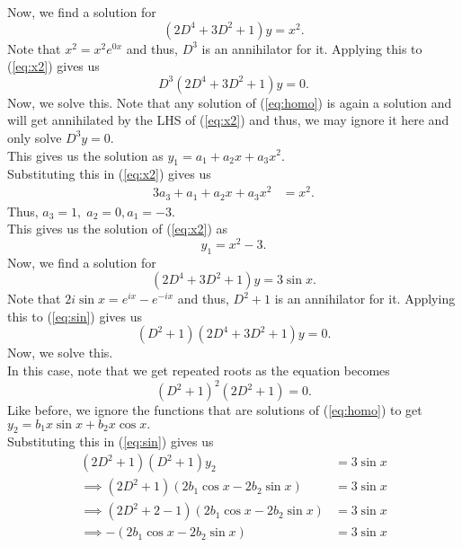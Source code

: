 \documentclass{article}
\begin{document}
\begin{enumerate}[label = Q.\arabic*.]
\begin{enumerate}[start = 8, label = (\roman*)]
		Now, we find a solution for
		\begin{equation} \label{eq:x2}
			(2D^4 + 3D^2 + 1)y = x^2.
		\end{equation}
		Note that $x^2 = x^2e^{0x}$ and thus, $D^3$ is an annihilator for it. Applying this to (\ref{eq:x2}) gives us
		\begin{equation*} 
			D^3(2D^4 + 3D^2 + 1)y = 0.
		\end{equation*}
		Now, we solve this. Note that any solution of (\ref{eq:homo}) is again a solution and will get annihilated by the LHS of (\ref{eq:x2}) and thus, we may ignore it here and only solve $D^3y = 0.$\\
		This gives us the solution as $y_1 = a_1 + a_2x + a_3x^2.$\\
		Substituting this in (\ref{eq:x2}) gives us
		\begin{align*} 
			3a_3 + a_1 + a_2x + a_3x^2 &= x^2.
		\end{align*}
		Thus, $a_3 = 1,\;a_2 = 0, a_1 = -3.$\\
		This gives us the solution of (\ref{eq:x2})	as 
		\begin{equation} \label{eq:solnx2}
			y_1 = x^2 - 3.
		\end{equation}
		Now, we find a solution for
		\begin{equation} \label{eq:sin}
			(2D^4 + 3D^2 + 1)y = 3\sin x.
		\end{equation}
		Note that $2i\sin x = e^{ix} - e^{-ix}$ and thus, $D^2 + 1$ is an annihilator for it. Applying this to (\ref{eq:sin}) gives us
		\begin{equation*} 
			(D^2 + 1)(2D^4 + 3D^2 + 1)y = 0.
		\end{equation*}
		Now, we solve this. \\
		In this case, note that we get repeated roots as the equation becomes
		\begin{equation*} 
			(D^2 + 1)^2(2D^2 + 1) = 0.
		\end{equation*}
		Like before, we ignore the functions that are solutions of (\ref{eq:homo}) to get $y_2 = b_1x\sin x + b_2x\cos x.$\\
		Substituting this in (\ref{eq:sin}) gives us
		\begin{align*} 
			(2D^2 + 1)(D^2 + 1)y_2 &= 3\sin x\\
			\implies (2D^2 + 1)(2b_1\cos x - 2b_2\sin x) &= 3\sin x\\
			\implies (2D^2 + 2 -1)(2b_1\cos x - 2b_2\sin x) &= 3\sin x\\
			\implies -(2b_1\cos x - 2b_2\sin x) &= 3\sin x\\

\end{align*}
\end{enumerate}
\end{enumerate}
\end{document}
